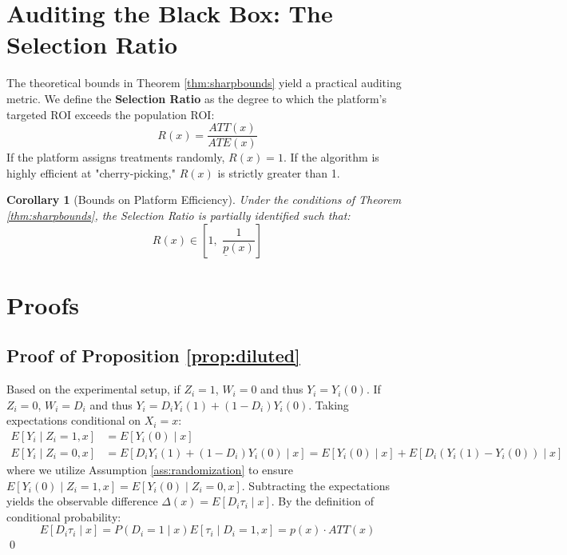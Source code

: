 \documentclass[11pt]{article}
\newtheorem{corollary}{Corollary}
\begin{document}
\section{Auditing the Black Box: The Selection Ratio}
The theoretical bounds in Theorem \ref{thm:sharpbounds} yield a practical auditing metric. We define the \textbf{Selection Ratio} as the degree to which the platform's targeted ROI exceeds the population ROI:
\begin{equation}
    R(x) = \frac{ATT(x)}{ATE(x)}
\end{equation}
If the platform assigns treatments randomly, $R(x)=1$. If the algorithm is highly efficient at "cherry-picking," $R(x)$ is strictly greater than 1.

\begin{corollary}[Bounds on Platform Efficiency]
\label{cor:ratio}
Under the conditions of Theorem \ref{thm:sharpbounds}, the Selection Ratio is partially identified such that:
\begin{equation}
    R(x) \in \left[ 1, \,\, \frac{1}{\underline{p}(x)} \right]
\end{equation}
\end{corollary}

\section{Proofs}

\subsection*{Proof of Proposition \ref{prop:diluted}}
Based on the experimental setup, if $Z_i=1$, $W_i=0$ and thus $Y_i = Y_i(0)$. If $Z_i=0$, $W_i = D_i$ and thus $Y_i = D_i Y_i(1) + (1-D_i)Y_i(0)$. Taking expectations conditional on $X_i=x$:
\begin{align*}
    E[Y_i \mid Z_i=1, x] &= E[Y_i(0) \mid x] \\
    E[Y_i \mid Z_i=0, x] &= E[D_i Y_i(1) + (1-D_i)Y_i(0) \mid x] = E[Y_i(0) \mid x] + E[D_i(Y_i(1)-Y_i(0)) \mid x]
\end{align*}
where we utilize Assumption \ref{ass:randomization} to ensure $E[Y_i(0) \mid Z_i=1, x] = E[Y_i(0) \mid Z_i=0, x]$. Subtracting the expectations yields the observable difference $\Delta(x) = E[D_i \tau_i \mid x]$. By the definition of conditional probability:
\[ E[D_i \tau_i \mid x] = P(D_i=1 \mid x) E[\tau_i \mid D_i=1, x] = p(x) \cdot ATT(x) \]
\qed
\end{document}
